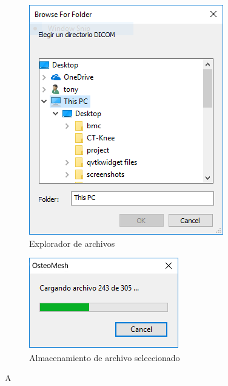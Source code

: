 \documentclass{article}
\begin{document}
\begin{figure}[!ht]
	\centering
	\begin{subfigure}[b]{0.45\textwidth}
		\includegraphics[width=\textwidth]{images/handling/3}
		\caption{Explorador de archivos} 
	\end{subfigure}
	\begin{subfigure}[b]{0.45\textwidth}
		\includegraphics[width=\textwidth]{images/handling/4}
		\caption{Almacenamiento de archivo seleccionado} 
	\end{subfigure}
	\caption{A}
	\label{fig:brahand:segments}
\end{figure}
\end{document}
